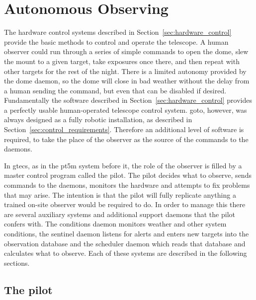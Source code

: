 
\newpage
\section{Autonomous Observing}
\label{sec:autonomous}
\begin{colsection}


\begin{colsection}

The hardware control systems described in Section~\ref{sec:hardware_control} provide the basic methods to control and operate the telescope. A human observer could run through a series of simple commands to open the dome, slew the mount to a given target, take exposures once there, and then repeat with other targets for the rest of the night. There is a limited autonomy provided by the dome daemon, so the dome will close in bad weather without the delay from a human sending the command, but even that can be disabled if desired. Fundamentally the software described in Section~\ref{sec:hardware_control} provides a perfectly usable human-operated telescope control system. \gls{goto}, however, was always designed as a fully robotic installation, as described in Section~\ref{sec:control_requirements}. Therefore an additional level of software is required, to take the place of the observer as the source of the commands to the daemons.

In \gls{gtecs}, as in the \gls{pt5m} system before it, the role of the observer is filled by a master control program called the pilot. The pilot decides what to observe, sends commands to the daemons, monitors the hardware and attempts to fix problems that may arise. The intention is that the pilot will fully replicate anything a trained on-site observer would be required to do. In order to manage this there are several auxiliary systems and additional support daemons that the pilot confers with. The conditions daemon monitors weather and other system conditions, the sentinel daemon listens for alerts and enters new targets into the observation database and the scheduler daemon which reads that database and calculates what to observe. Each of these systems are described in the following sections.

\end{colsection}


\subsection{The pilot}
\label{sec:pilot}
\begin{colsection}


\end{colsection}
\end{colsection}

